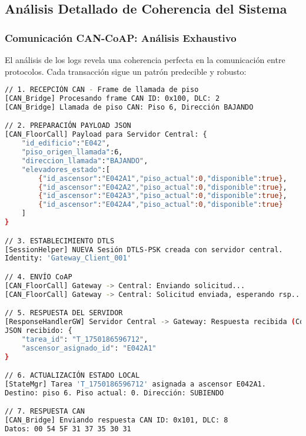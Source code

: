 \subsection{Análisis Detallado de Coherencia del Sistema}\label{subsec:coherencia-sistema}

\subsubsection{Comunicación CAN-CoAP: Análisis Exhaustivo}

El análisis de los logs revela una coherencia perfecta en la comunicación entre protocolos. Cada transacción sigue un patrón predecible y robusto:

\begin{lstlisting}[language=bash,caption={Flujo CAN-CoAP Completo - Instancia Puerto 6000},label={lst:flujo-can-coap}]
// 1. RECEPCIÓN CAN - Frame de llamada de piso
[CAN_Bridge] Procesando frame CAN ID: 0x100, DLC: 2
[CAN_Bridge] Llamada de piso CAN: Piso 6, Dirección BAJANDO

// 2. PREPARACIÓN PAYLOAD JSON
[CAN_FloorCall] Payload para Servidor Central: {
    "id_edificio":"E042",
    "piso_origen_llamada":6,
    "direccion_llamada":"BAJANDO",
    "elevadores_estado":[
        {"id_ascensor":"E042A1","piso_actual":0,"disponible":true},
        {"id_ascensor":"E042A2","piso_actual":0,"disponible":true},
        {"id_ascensor":"E042A3","piso_actual":0,"disponible":true},
        {"id_ascensor":"E042A4","piso_actual":0,"disponible":true}
    ]
}

// 3. ESTABLECIMIENTO DTLS
[SessionHelper] NUEVA Sesión DTLS-PSK creada con servidor central.
Identity: 'Gateway_Client_001'

// 4. ENVÍO CoAP
[CAN_FloorCall] Gateway -> Central: Enviando solicitud...
[CAN_FloorCall] Gateway -> Central: Solicitud enviada, esperando rsp...

// 5. RESPUESTA DEL SERVIDOR
[ResponseHandlerGW] Servidor Central -> Gateway: Respuesta recibida (Code: 2.69)
JSON recibido: {
    "tarea_id": "T_1750186596712",
    "ascensor_asignado_id": "E042A1"
}

// 6. ACTUALIZACIÓN ESTADO LOCAL
[StateMgr] Tarea 'T_1750186596712' asignada a ascensor E042A1.
Destino: piso 6. Piso actual: 0. Dirección: SUBIENDO

// 7. RESPUESTA CAN
[CAN_Bridge] Enviando respuesta CAN ID: 0x101, DLC: 8
Datos: 00 54 5F 31 37 35 30 31
\end{lstlisting}

